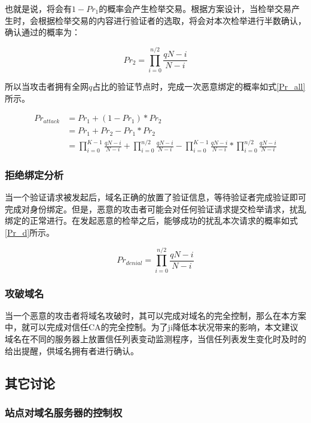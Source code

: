 也就是说，将会有$1-Pr_1$的概率会产生检举交易。根据方案设计，当检举交易产生时，会根据检举交易的内容进行验证者的选取，将会对本次检举进行半数确认，确认通过的概率为：

\begin{equation}\label{Pr_2}
Pr_2 = \prod_{i=0}^{n/2}\frac{qN-i}{N-i}
\end{equation}

所以当攻击者拥有全网$q$占比的验证节点时，完成一次恶意绑定的概率如式\ref{Pr_all}所示。

\begin{align}
\label{Pr_all}  Pr_{attack} &= Pr_1 + (1-Pr_1) * Pr_2 \\
							&= Pr_1 + Pr_2 - Pr_1 * Pr_2 \\
             				&= \prod_{i=0}^{K-1}\frac{qN-i}{N-i} + \prod_{i=0}^{n/2}\frac{qN-i}{N-i} - \prod_{i=0}^{K-1}\frac{qN-i}{N-i} * \prod_{i=0}^{n/2}\frac{qN-i}{N-i} 
\end{align}


\subsubsection{拒绝绑定分析}

当一个验证请求被发起后，域名正确的放置了验证信息，等待验证者完成验证即可完成对身份绑定。但是，恶意的攻击者可能会对任何验证请求提交检举请求，扰乱绑定的正常进行。在发起恶意的检举之后，能够成功的扰乱本次请求的概率如式\ref{Pr_d}所示。

\begin{equation}\label{Pr_d}
Pr_{denial} = \prod_{i=0}^{n/2}\frac{qN-i}{N-i}
\end{equation}

\subsubsection{攻破域名}

当一个恶意的攻击者将域名攻破时，其可以完成对域名的完全控制，那么在本方案中，就可以完成对信任CA的完全控制。为了ji降低本状况带来的影响，本文建议域名在不同的服务器上放置信任列表变动监测程序，当信任列表发生变化时及时的给出提醒，供域名拥有者进行确认。





\subsection{其它讨论}

\subsubsection{站点对域名服务器的控制权}

